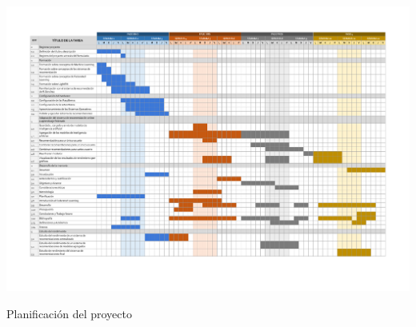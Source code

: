 \begin{table}
    \includegraphics[angle=90,  width=\linewidth, height=\textheight]{PDF/GanttPlanificacion}
    \caption{Planificación del proyecto}\label{table:planificacion}
\end{table}